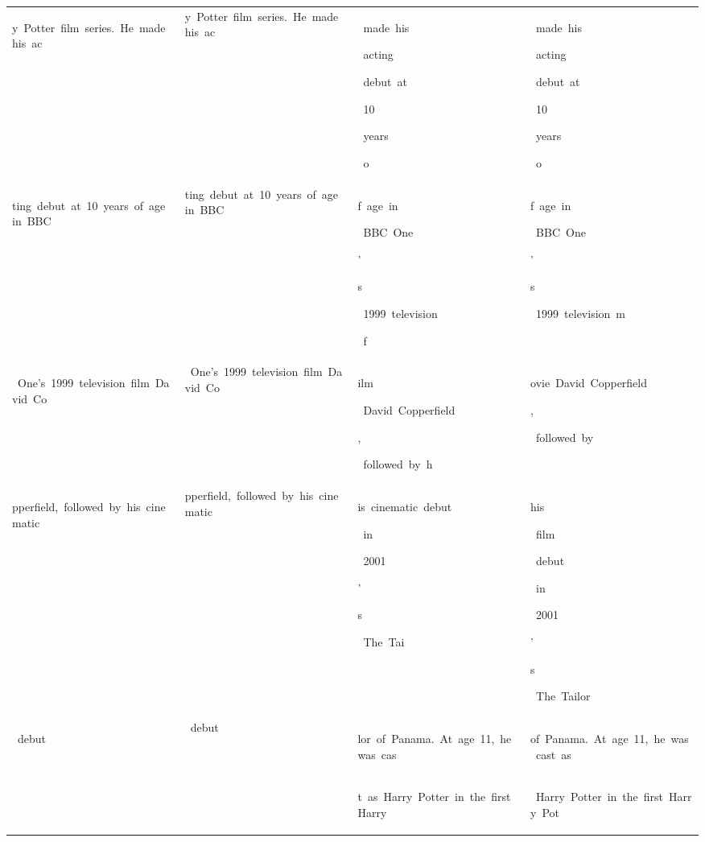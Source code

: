 \begin{table}[h]
\begin{tabular}{ l l l l }
 \colorbox{cm_32!40}{\strut y\ Potter\ film\ series.\ He\ made\ his\ ac} & y\ Potter\ film\ series.\ He\ made\ his\ ac & \colorbox{cm_0!40}{\strut \ made\ his}\colorbox{cm_12!40}{\strut \ acting}\colorbox{cm_0!40}{\strut \ debut\ at}\colorbox{cm_12!40}{\strut \ 10}\colorbox{cm_25!40}{\strut \ years}\colorbox{cm_12!40}{\strut \ o} & \colorbox{cm_0!40}{\strut \ made\ his}\colorbox{cm_12!40}{\strut \ acting}\colorbox{cm_0!40}{\strut \ debut\ at}\colorbox{cm_12!40}{\strut \ 10}\colorbox{cm_25!40}{\strut \ years}\colorbox{cm_12!40}{\strut \ o} \\ 
 \colorbox{cm_32!40}{\strut ting\ debut\ at\ 10\ years\ of\ age\ in\ BBC} & ting\ debut\ at\ 10\ years\ of\ age\ in\ BBC & \colorbox{cm_12!40}{\strut f\ age\ in}\colorbox{cm_0!40}{\strut \ BBC\ One}\colorbox{cm_12!40}{\strut '}\colorbox{cm_25!40}{\strut s}\colorbox{cm_0!40}{\strut \ 1999\ television}\colorbox{cm_12!40}{\strut \ f} & \colorbox{cm_12!40}{\strut f\ age\ in}\colorbox{cm_0!40}{\strut \ BBC\ One}\colorbox{cm_12!40}{\strut '}\colorbox{cm_25!40}{\strut s}\colorbox{cm_0!40}{\strut \ 1999\ television\ m} \\ 
 \colorbox{cm_32!40}{\strut \ One's\ 1999\ television\ film\ David\ Co} & \ One's\ 1999\ television\ film\ David\ Co & \colorbox{cm_12!40}{\strut ilm}\colorbox{cm_0!40}{\strut \ David\ Copperfield}\colorbox{cm_12!40}{\strut ,}\colorbox{cm_0!40}{\strut \ followed\ by\ h} & \colorbox{cm_0!40}{\strut ovie\ David\ Copperfield}\colorbox{cm_12!40}{\strut ,}\colorbox{cm_0!40}{\strut \ followed\ by\ } \\ 
 \colorbox{cm_32!40}{\strut pperfield,\ followed\ by\ his\ cinematic} & pperfield,\ followed\ by\ his\ cinematic & \colorbox{cm_0!40}{\strut is\ cinematic\ debut}\colorbox{cm_12!40}{\strut \ in}\colorbox{cm_25!40}{\strut \ 2001}\colorbox{cm_38!40}{\strut '}\colorbox{cm_51!40}{\strut s}\colorbox{cm_63!40}{\strut \ The\ Tai} & \colorbox{cm_0!40}{\strut his}\colorbox{cm_12!40}{\strut \ film}\colorbox{cm_0!40}{\strut \ debut}\colorbox{cm_12!40}{\strut \ in}\colorbox{cm_25!40}{\strut \ 2001}\colorbox{cm_38!40}{\strut '}\colorbox{cm_51!40}{\strut s}\colorbox{cm_63!40}{\strut \ The\ Tailor\ } \\ 
 \colorbox{cm_32!40}{\strut \ debut} & \ debut & \colorbox{cm_63!40}{\strut lor\ of\ Panama.\ At\ age\ 11,\ he\ was\ cas} & \colorbox{cm_63!40}{\strut of\ Panama.\ At\ age\ 11,\ he\ was\ cast\ as} \\ 
  &  & \colorbox{cm_63!40}{\strut t\ as\ Harry\ Potter\ in\ the\ first\ Harry} & \colorbox{cm_63!40}{\strut \ Harry\ Potter\ in\ the\ first\ Harry\ Pot} \\ 

\end{tabular}
\end{table}
